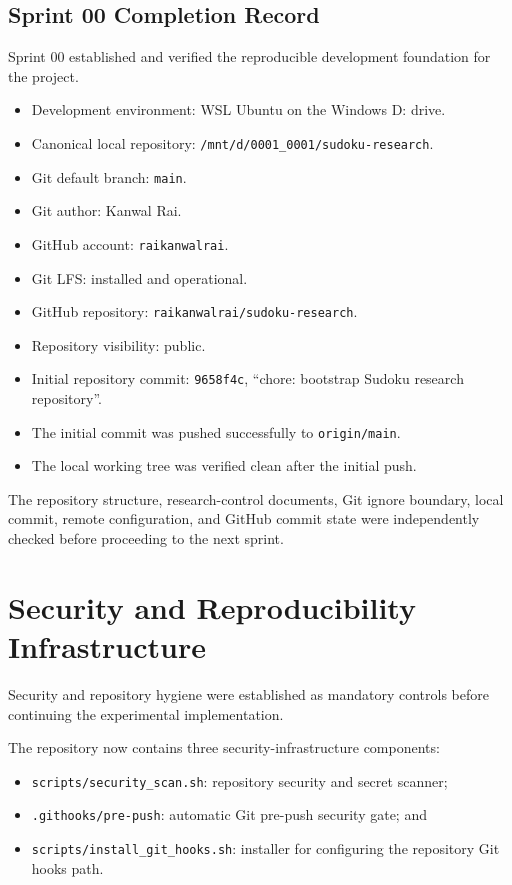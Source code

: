 \documentclass[11pt,a4paper]{article}
\begin{document}
\subsection{Sprint 00 Completion Record}

Sprint 00 established and verified the reproducible development foundation
for the project.

\begin{itemize}
    \item Development environment: WSL Ubuntu on the Windows D: drive.
    \item Canonical local repository:
    \texttt{/mnt/d/0001\_0001/sudoku-research}.
    \item Git default branch: \texttt{main}.
    \item Git author: Kanwal Rai.
    \item GitHub account: \texttt{raikanwalrai}.
    \item Git LFS: installed and operational.
    \item GitHub repository: \texttt{raikanwalrai/sudoku-research}.
    \item Repository visibility: public.
    \item Initial repository commit:
    \texttt{9658f4c}, ``chore: bootstrap Sudoku research repository''.
    \item The initial commit was pushed successfully to
    \texttt{origin/main}.
    \item The local working tree was verified clean after the initial push.
\end{itemize}

The repository structure, research-control documents, Git ignore boundary,
local commit, remote configuration, and GitHub commit state were independently
checked before proceeding to the next sprint.


\section{Security and Reproducibility Infrastructure}

Security and repository hygiene were established as mandatory controls
before continuing the experimental implementation.

The repository now contains three security-infrastructure components:

\begin{itemize}
    \item \texttt{scripts/security\_scan.sh}: repository security and secret scanner;
    \item \texttt{.githooks/pre-push}: automatic Git pre-push security gate; and
    \item \texttt{scripts/install\_git\_hooks.sh}: installer for configuring the
    repository Git hooks path.
\end{itemize}
\end{document}
